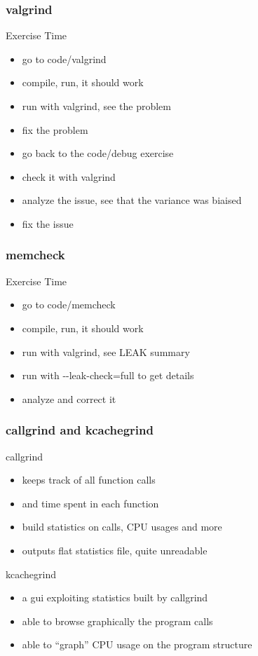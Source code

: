 \begin{frame}[fragile]
  \frametitle{valgrind}
  \begin{alertblock}{Exercise Time}
    \begin{itemize}
    \item go to code/valgrind
    \item compile, run, it should work
    \item run with valgrind, see the problem
    \item fix the problem
      \vspace{.3cm}
    \item go back to the code/debug exercise
    \item check it with valgrind
    \item analyze the issue, see that the variance was biaised
    \item fix the issue
    \end{itemize}
  \end{alertblock}
\end{frame}

\begin{frame}[fragile]
  \frametitle{memcheck}
  \begin{alertblock}{Exercise Time}
    \begin{itemize}
    \item go to code/memcheck
    \item compile, run, it should work
    \item run with valgrind, see LEAK summary
    \item run with -{}-leak-check=full to get details
    \item analyze and correct it
    \end{itemize}
  \end{alertblock}
\end{frame}

\begin{frame}[fragile]
  \frametitle{callgrind and kcachegrind}
  \begin{block}{callgrind}
    \begin{itemize}
      \item keeps track of all function calls
      \item and time spent in each function
      \item build statistics on calls, CPU usages and more
      \item outputs flat statistics file, quite unreadable
    \end{itemize}
  \end{block}
  \begin{block}{kcachegrind}
    \begin{itemize}
      \item a gui exploiting statistics built by callgrind
      \item able to browse graphically the program calls
      \item able to ``graph'' CPU usage on the program structure
    \end{itemize}
  \end{block}
\end{frame}

